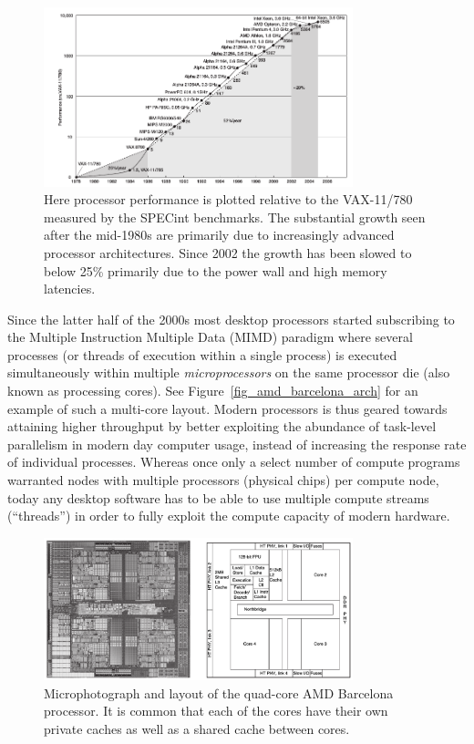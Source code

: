 \begin{figure}[ht!]
 \begin{mdframed}
  \centering
  \includegraphics[width=0.8\textwidth]{images/runtime_decrease_cpu.png}
  \caption[Program response time decline]{Here processor performance is plotted relative to the VAX-11/780 measured by the SPECint benchmarks. The substantial growth seen after the mid-1980s
  are primarily due to increasingly advanced processor architectures. Since 2002 the growth has been slowed to below 25\% primarily due to the power wall and high memory latencies.}
  \label{fig_runtime_decrease_cpu}
 \end{mdframed}
\end{figure}

Since the latter half of the 2000s most desktop processors started subscribing to the Multiple Instruction Multiple Data (MIMD) paradigm where several processes 
(or threads of execution within a single process) is executed simultaneously within multiple \textit{microprocessors} on the same processor die (also known as processing cores). 
See Figure~\ref{fig_amd_barcelona_arch} for an example of such a multi-core layout. Modern processors is thus geared towards attaining higher throughput by better exploiting the 
abundance of task-level parallelism in modern day computer usage, instead of increasing the response rate of individual processes. Whereas once only a select number of compute 
programs warranted nodes with multiple processors (physical chips) per compute node, today any desktop software has to be able to use multiple compute streams (``threads'') 
in order to fully exploit the compute capacity of modern hardware. 
\begin{figure}[ht!]
 \begin{mdframed}
  \centering
  \includegraphics[width=0.8\textwidth]{images/amd_barcelona.png}
  \caption[AMD Barcelona]{Microphotograph and layout of the quad-core AMD Barcelona processor. It is common that each of the cores have their own private caches as well as a shared
  cache between cores.}
  \label{fig_runtime_decrease_cpu}
 \end{mdframed}
\end{figure}

